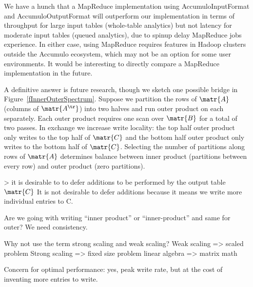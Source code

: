 


We have a hunch that a MapReduce implementation using AccumuloInputFormat and AccumuloOutputFormat 
will outperform our implementation in terms of throughput for large input tables (whole-table analytics)
but not latency for moderate input tables (queued analytics), due to spinup delay MapReduce jobs experience.
In either case, using MapReduce requires features in Hadoop clusters outside the 
Accumulo ecosystem, which may not be an option for some user environments.
It would be interesting to directly compare a MapReduce implementation in the future.



A definitive answer is future research, though we sketch one possible bridge in Figure~\ref{fInnerOuterSpectrum}.
Suppose we partition the rows of $\matr{A}$ (columns of $\matr{A^\tr}$) into two halves 
and run outer product on each separately.
Each outer product requires one scan over $\matr{B}$ for a total of two passes.
In exchange we increase write locality:
the top half outer product only writes to the top half of $\matr{C}$ and 
the bottom half outer product only writes to the bottom half of $\matr{C}$.
Selecting the number of partitions along rows of $\matr{A}$ determines
balance between inner product (partitions between every row) and outer product (zero partitions).






> it is desirable to to defer additions to be performed by the output table $\matr{C}$
It is not desirable to defer additions because it means we write more individual entries to C.

Are we going with writing  ``inner product'' or  ``inner-product'' and same for outer?  We need consistency.

Why not use the term strong scaling and weak scaling?
Weak scaling => scaled problem
Strong scaling => fixed size problem
linear algebra => matrix math

Concern for optimal performance: yes, peak write rate, but at the cost of inventing more entries to write.





